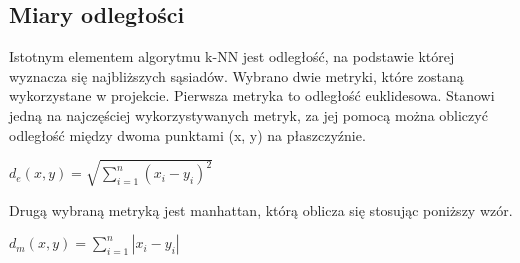 \subsection{Miary odległości}
Istotnym elementem algorytmu k-NN jest odległość, na podstawie której wyznacza się najbliższych sąsiadów. Wybrano dwie  metryki, które zostaną wykorzystane w projekcie.
Pierwsza metryka to odległość euklidesowa. Stanowi jedną na najczęściej wykorzystywanych metryk, za jej pomocą można obliczyć odległość między dwoma punktami (x, y) na płaszczyźnie.

\begin{center}
\begin{math}
 d_{e}\left( x,y\right)   = \sqrt {\sum _{i=1}^{n}  \left( x_{i}-y_{i}\right)^2 }
\end{math}
\end{center}

Drugą wybraną metryką jest manhattan, którą oblicza się stosując poniższy wzór.

\begin{center}
\begin{math}
 d_{m}\left( x,y\right)   = \sum_{i=1}^n |x_i-y_i|
\end{math}
\end{center}

